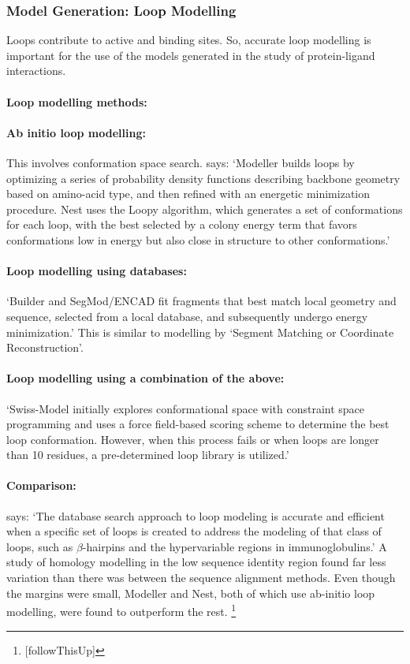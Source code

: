\documentclass[10pt]{report}
\begin{document}
\subsubsection{Model Generation: Loop Modelling}

Loops contribute to active and binding sites. So, accurate loop modelling is important for the use of the models generated in the study of protein-ligand interactions. \cite{marti-renom2000com}

\paragraph{Loop modelling methods:}

\paragraph{Ab initio loop modelling:} This involves conformation space search. \cite{dalton07} says: `Modeller builds loops by optimizing a series of probability density functions describing backbone geometry based on amino-acid type, and then refined with an energetic minimization procedure. Nest uses the Loopy algorithm, which generates a set of conformations for each loop, with the best selected by a colony energy term that favors conformations low in energy but also close in structure to other conformations.'

\paragraph{Loop modelling using databases:} `Builder and SegMod/ENCAD fit fragments that best match local geometry and sequence, selected from a local database, and subsequently undergo energy minimization.' \cite{dalton07} This is similar to modelling by `Segment Matching or Coordinate Reconstruction'.

\paragraph{Loop modelling using a combination of the above:} `Swiss-Model initially explores conformational space with constraint space programming and uses a force field-based scoring scheme to determine the best loop conformation. However, when this process fails or when loops are longer than 10 residues, a pre-determined loop library is utilized.' \cite{dalton07}

\paragraph{Comparison:} \cite{marti-renom2000com} says: `The database search approach to loop modeling is accurate and efficient when a specific set of loops is created to address the modeling of that class of loops, such as $\beta$-hairpins and the hypervariable regions in immunoglobulins.' A study of homology modelling in the low sequence identity region found far less variation than there was between the sequence alignment methods. Even though the margins were small, Modeller and Nest, both of which use ab-initio loop modelling, were found to outperform the rest. \cite{dalton07} \footnote{[followThisUp]}
\end{document}
